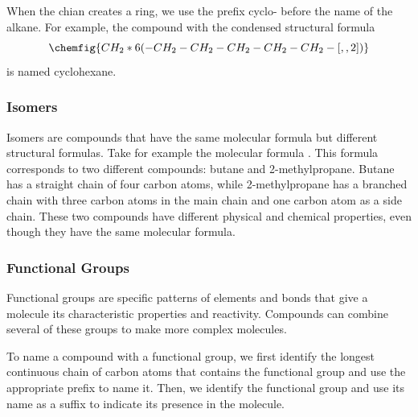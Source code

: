 When the chian creates a ring, we use the prefix cyclo- before the name of the alkane. For example, the compound with the condensed structural formula
\[\chemfig{CH_2*6(-CH_2-CH_2-CH_2-CH_2-CH_2-[,,2])}\]
is named cyclohexane. 
\subsubsection{Isomers}
Isomers are compounds that have the same molecular formula but different structural formulas. Take for example the molecular formula . This formula corresponds to two different compounds: butane and 2-methylpropane. Butane has a straight chain of four carbon atoms, while 2-methylpropane has a branched chain with three carbon atoms in the main chain and one carbon atom as a side chain. These two compounds have different physical and chemical properties, even though they have the same
 molecular formula.
\subsubsection{Functional Groups}
Functional groups are specific patterns of elements and bonds that give a molecule its characteristic properties and reactivity. Compounds can combine several of these groups to make more complex molecules.

To name a compound with a functional group, we first identify the longest continuous chain of carbon atoms that contains the functional group and use the appropriate prefix to name it. Then, we identify the functional group and use its name as a suffix to indicate its presence in the molecule. 

